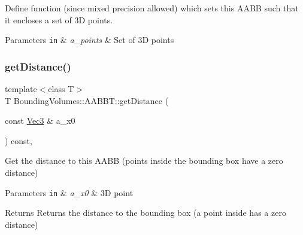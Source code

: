 Define function (since mixed precision allowed) which sets this A\+A\+BB such that it encloses a set of 3D points. 


\begin{DoxyParams}[1]{Parameters}
\mbox{\tt in}  & {\em a\+\_\+points} & Set of 3D points \\
\hline
\end{DoxyParams}
\mbox{\label{classEBGeometry_1_1BoundingVolumes_1_1AABBT_ad751f30ffaef31c0afb66d5d401bbb8f}} 
\subsubsection{\texorpdfstring{get\+Distance()}{getDistance()}}
{\footnotesize\ttfamily template$<$class T$>$ \\
T Bounding\+Volumes\+::\+A\+A\+B\+B\+T\+::get\+Distance (\begin{DoxyParamCaption}\item[{const \hyperlink{classEBGeometry_1_1BoundingVolumes_1_1AABBT_af139f618de2c5138990a63e93eb7d066}{Vec3} \&}]{a\+\_\+x0 }\end{DoxyParamCaption}) const\hspace{0.3cm}{\ttfamily [inline]}, {\ttfamily [noexcept]}}



Get the distance to this A\+A\+BB (points inside the bounding box have a zero distance) 


\begin{DoxyParams}[1]{Parameters}
\mbox{\tt in}  & {\em a\+\_\+x0} & 3D point \\
\hline
\end{DoxyParams}
\begin{DoxyReturn}{Returns}
Returns the distance to the bounding box (a point inside has a zero distance) 
\end{DoxyReturn}
\mbox{\label{classEBGeometry_1_1BoundingVolumes_1_1AABBT_a14091ab693c3389b88cad60d68116848}} 
